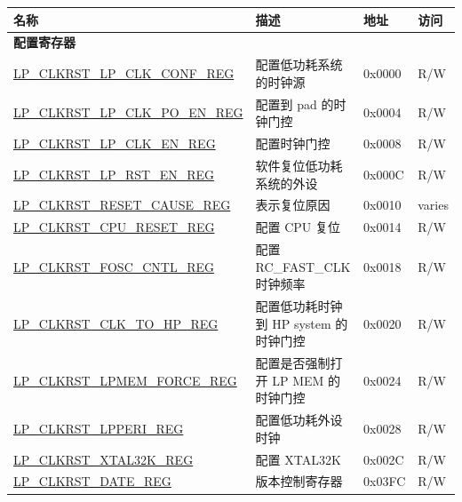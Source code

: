 \begin{longtable}{ | p{6cm} | p{7.2cm} | p{1.3cm} | p{1cm} | }
\hline\rowcolor{lightgray}
\textbf{名称} & \textbf{描述} &  \textbf{地址} & \textbf{访问} \\ \hline
\endhead
\multicolumn{4}{|l|}{\textbf{配置寄存器}} \\ \hline
\hyperref[regdesc:LPCLKRSTLPCLKCONFREG]{LP\_CLKRST\_LP\_CLK\_CONF\_REG} & 配置低功耗系统的时钟源 & 0x0000 & R/W \\ \hline
\hyperref[regdesc:LPCLKRSTLPCLKPOENREG]{LP\_CLKRST\_LP\_CLK\_PO\_EN\_REG} & 配置到 pad 的时钟门控 & 0x0004 & R/W \\ \hline
\hyperref[regdesc:LPCLKRSTLPCLKENREG]{LP\_CLKRST\_LP\_CLK\_EN\_REG} & 配置时钟门控 & 0x0008 & R/W \\ \hline
\hyperref[regdesc:LPCLKRSTLPRSTENREG]{LP\_CLKRST\_LP\_RST\_EN\_REG} & 软件复位低功耗系统的外设 & 0x000C & R/W \\ \hline
\hyperref[regdesc:LPCLKRSTRESETCAUSEREG]{LP\_CLKRST\_RESET\_CAUSE\_REG} & 表示复位原因 & 0x0010 & varies \\ \hline
\hyperref[regdesc:LPCLKRSTCPURESETREG]{LP\_CLKRST\_CPU\_RESET\_REG} & 配置 CPU 复位 & 0x0014 & R/W \\ \hline
\hyperref[regdesc:LPCLKRSTFOSCCNTLREG]{LP\_CLKRST\_FOSC\_CNTL\_REG} & 配置 RC\_FAST\_CLK 时钟频率 & 0x0018 & R/W \\ \hline
\hyperref[regdesc:LPCLKRSTCLKTOHPREG]{LP\_CLKRST\_CLK\_TO\_HP\_REG} & 配置低功耗时钟到 HP system 的时钟门控 & 0x0020 & R/W \\ \hline
\hyperref[regdesc:LPCLKRSTLPMEMFORCEREG]{LP\_CLKRST\_LPMEM\_FORCE\_REG} & 配置是否强制打开 LP MEM 的时钟门控 & 0x0024 & R/W \\ \hline
\hyperref[regdesc:LPCLKRSTLPPERIREG]{LP\_CLKRST\_LPPERI\_REG} & 配置低功耗外设时钟 & 0x0028 & R/W \\ \hline
\hyperref[regdesc:LPCLKRSTXTAL32KREG]{LP\_CLKRST\_XTAL32K\_REG} & 配置 XTAL32K & 0x002C & R/W \\ \hline
\hyperref[regdesc:LPCLKRSTDATEREG]{LP\_CLKRST\_DATE\_REG} & 版本控制寄存器 & 0x03FC & R/W \\ \hline
\end{longtable}


